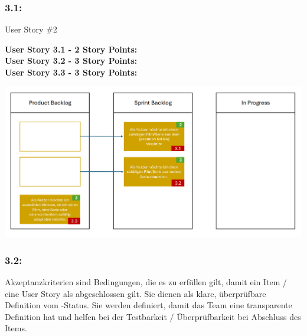 \subsubsection*{3.1:}

User Story \#2 

\textbf{User Story 3.1 - 2 Story Points:} \\
\textbf{User Story 3.2 - 3 Story Points:} \\
\textbf{User Story 3.3 - 3 Story Points:} 

\includegraphics[width=\textwidth]{images/UE3_3.1.png}

\subsubsection*{3.2:}

Akzeptanzkriterien sind Bedingungen, die es zu erfüllen gilt, damit ein Item / eine User Story als abgeschlossen gilt. Sie dienen als klare, überprüfbare Definition vom -Status. Sie werden definiert, damit das Team eine transparente Definition hat und helfen bei der Testbarkeit / Überprüfbarkeit bei Abschluss des Items.

